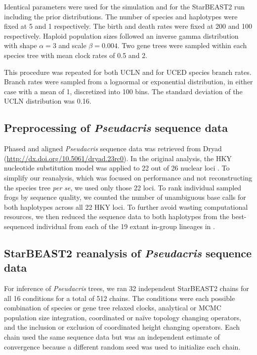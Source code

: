 \documentclass[nogrid]{MBE}%
\begin{document}
Identical parameters were used for the simulation and for the StarBEAST2 run
including the prior distributions. The
number of species and haplotypes were fixed at 5 and 1 respectively.
The birth and death rates were fixed at 200 and 100 respectively. Haploid
population sizes followed an inverse gamma distribution with shape $\alpha =
3$ and scale $\beta = 0.004$. Two gene trees were sampled within each species
tree with mean clock rates of 0.5 and 2.

This procedure was repeated for both UCLN and for UCED species branch rates.
Branch rates were sampled from a lognormal or exponential distribution, in
either case with a mean of 1, discretized into 100 bins. The standard deviation
of the UCLN distribution was 0.16.

\subsection{Preprocessing of \textit{Pseudacris} sequence data}

Phased and aligned \textit{Pseudacris} sequence data was retrieved from Dryad
(\url{http://dx.doi.org/10.5061/dryad.23rc0}). In the original analysis, the HKY nucleotide substitution
model was applied to 22 out of 26 nuclear loci \citep{Barrow201478}. To simplify
our reanalysis, which was focused on performance and not reconstructing the
species tree \textit{per se}, we used only those 22 loci. To rank
individual sampled frogs by sequence quality, we counted the number of unambiguous base
calls for both haplotypes across all 22 HKY loci. To further avoid wasting
computational resources, we then reduced the sequence data to both haplotypes
from the best-sequenced individual from each of the 19 extant in-group lineages
in \cite{Barrow201478}.

\subsection{StarBEAST2 reanalysis of \textit{Pseudacris} sequence data}

For inference of \textit{Pseudacris} trees, we ran 32 independent StarBEAST2
chains for all 16 conditions for a total of 512 chains. The conditions were each
possible combination of species or gene tree relaxed clocks, analytical or
MCMC population size integration, coordinated or na\"ive topology changing
operators, and the inclusion or exclusion of coordinated height changing
operators. Each chain used the same sequence data but was an independent
estimate of convergence because a different random seed was used to initialize
each chain.
\end{document}
